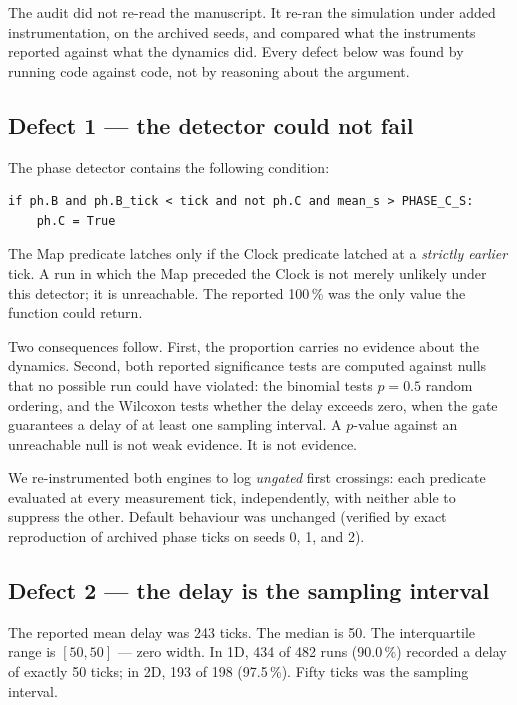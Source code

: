 \documentclass[11pt,letterpaper]{article}
\begin{document}
The audit did not re-read the manuscript. It re-ran the simulation under
added instrumentation, on the archived seeds, and compared what the
instruments reported against what the dynamics did. Every defect below
was found by running code against code, not by reasoning about the
argument.

\subsection{Defect 1 --- the detector could not fail}

The phase detector contains the following condition:

\begin{lstlisting}
if ph.B and ph.B_tick < tick and not ph.C and mean_s > PHASE_C_S:
    ph.C = True
\end{lstlisting}

The Map predicate latches only if the Clock predicate latched at a
\emph{strictly earlier} tick. A run in which the Map preceded the Clock
is not merely unlikely under this detector; it is unreachable. The
reported 100\,\% was the only value the function could return.

Two consequences follow. First, the proportion carries no evidence about
the dynamics. Second, both reported significance tests are computed
against nulls that no possible run could have violated: the binomial
tests $p = 0.5$ random ordering, and the Wilcoxon tests whether the delay
exceeds zero, when the gate guarantees a delay of at least one sampling
interval. A $p$-value against an unreachable null is not weak evidence.
It is not evidence.

We re-instrumented both engines to log \emph{ungated} first crossings:
each predicate evaluated at every measurement tick, independently, with
neither able to suppress the other. Default behaviour was unchanged
(verified by exact reproduction of archived phase ticks on seeds 0, 1,
and 2).

\subsection{Defect 2 --- the delay is the sampling interval}

The reported mean delay was 243 ticks. The median is 50. The
interquartile range is $[50, 50]$ --- zero width. In 1D, 434 of 482 runs
(90.0\,\%) recorded a delay of exactly 50 ticks; in 2D, 193 of 198
(97.5\,\%). Fifty ticks was the sampling interval.
\end{document}
